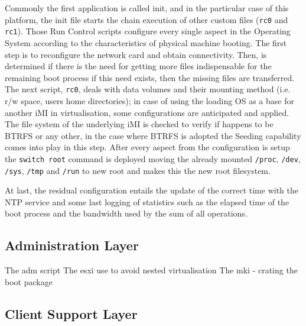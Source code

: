 Commonly the first application is called init, and in the particular case of this platform, the init file starts the chain execution of other custom files (\texttt{rc0} and \texttt{rc1}). Those Run Control scripts configure every single aspect in the Operating System according to the characteristics of physical machine booting. The first step is to reconfigure the network card and obtain connectivity. Then, is determined if there is the need for getting more files indispensable for the remaining boot process if this need exists, then the missing files are transferred. The next script, \texttt{rc0}, deals with data volumes and their mounting method (i.e. r/w space, users home directories); in case of using the loading OS as a base for another iMI in virtualisation, some configurations are anticipated and applied. The file system of the underlying iMI is checked to verify if happens to be BTRFS or any other, in the case where BTRFS is adopted the Seeding capability comes into play in this step. After every aspect from the configuration is setup the \texttt{switch root} command is deployed moving the already mounted \texttt{/proc}, \texttt{/dev}, \texttt{/sys}, \texttt{/tmp} and \texttt{/run} to new root and makes this the new root filesystem.

At last, the residual configuration entails the update of the correct time with the NTP service and some last logging of statistics such as the elapsed time of the boot process and the bandwidth used by the sum of all operations.



\subsection{Administration Layer}
\label{sub:icbd_architecture_adm}

The adm script
The esxi use to avoid nested virtualisation
The mki - crating the boot package


\subsection{Client Support Layer}
\label{sub:icbd_architecture_client}


